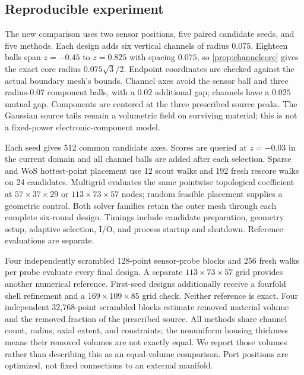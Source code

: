 \subsection{Reproducible experiment}
The new comparison uses two sensor positions, five paired candidate
seeds, and five methods. Each design adds six vertical channels of
radius $0.075$. Eighteen balls span $z=-0.45$ to $z=0.825$ with
spacing $0.075$, so \cref{prop:channelcore} gives the exact core radius
$0.075\sqrt{3}/2$. Endpoint coordinates are checked against the
actual boundary mesh's bounds. Channel axes avoid the sensor ball
and three radius-$0.07$ component balls, with a $0.02$ additional
gap; channels have a $0.025$ mutual gap. Components are centered at
the three prescribed source peaks. The Gaussian source tails remain
a volumetric field on surviving material; this is not a fixed-power
electronic-component model.

Each seed gives 512 common candidate axes. Scores are queried at
$z=-0.03$ in the current domain and all channel balls are added after
each selection. Sparse \method{} and WoS hottest-point placement use
12 scout walks and 192 fresh rescore walks on 24 candidates.
Multigrid evaluates the same pointwise topological coefficient at
$57\times37\times29$ or $113\times73\times57$ nodes; random feasible
placement supplies a geometric control. Both solver families retain
the outer mesh through each complete six-round design. Timings include
candidate preparation, geometry setup, adaptive selection, I/O,
and process startup and shutdown. Reference evaluations are separate.

Four independently scrambled 128-point sensor-probe blocks and 256
fresh walks per probe evaluate every final design. A separate
$113\times73\times57$ grid provides another numerical reference.
First-seed designs additionally receive a fourfold shell refinement
and a $169\times109\times85$ grid check. Neither reference is exact.
Four independent 32,768-point scrambled blocks estimate removed
material volume and the removed fraction of the prescribed source.
All methods share channel count, radius, axial extent, and constraints;
the nonuniform housing thickness means their removed volumes are not
exactly equal. We report those volumes rather than describing this as
an equal-volume comparison. Port positions are optimized, not fixed
connections to an external manifold.




